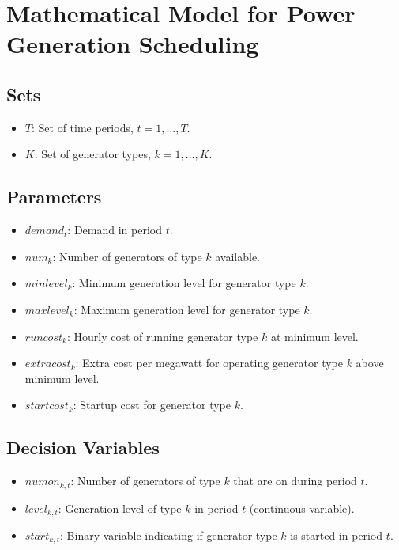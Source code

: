 \documentclass{article}
\begin{document}
\section*{Mathematical Model for Power Generation Scheduling}

\subsection*{Sets}
\begin{itemize}
    \item $T$: Set of time periods, $t=1,\ldots,T$.
    \item $K$: Set of generator types, $k=1,\ldots,K$.
\end{itemize}

\subsection*{Parameters}
\begin{itemize}
    \item $demand_t$: Demand in period $t$.
    \item $num_k$: Number of generators of type $k$ available.
    \item $minlevel_k$: Minimum generation level for generator type $k$.
    \item $maxlevel_k$: Maximum generation level for generator type $k$.
    \item $runcost_k$: Hourly cost of running generator type $k$ at minimum level.
    \item $extracost_k$: Extra cost per megawatt for operating generator type $k$ above minimum level.
    \item $startcost_k$: Startup cost for generator type $k$.
\end{itemize}

\subsection*{Decision Variables}
\begin{itemize}
    \item $numon_{k,t}$: Number of generators of type $k$ that are on during period $t$.
    \item $level_{k,t}$: Generation level of type $k$ in period $t$ (continuous variable).
    \item $start_{k,t}$: Binary variable indicating if generator type $k$ is started in period $t$.
\end{itemize}
\end{document}
